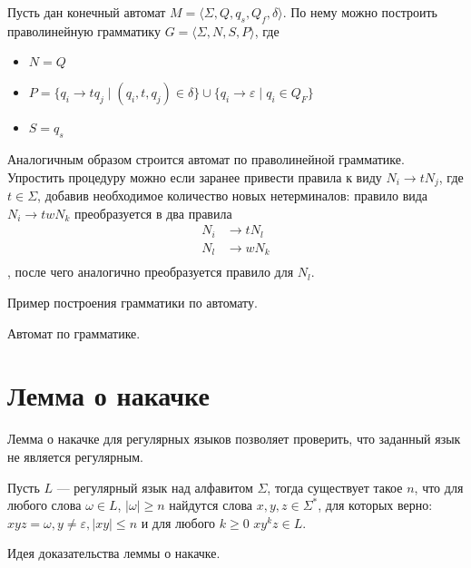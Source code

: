 Пусть дан конечный автомат $M = \langle \Sigma, Q, q_s, Q_f, \delta \rangle$. По нему можно построить праволинейную грамматику $G=\langle \Sigma, N, S, P \rangle$, где
\begin{itemize}
    \item $N = Q$
    \item $P = \{ q_i \to t q_j \mid (q_i, t, q_j)\in \delta\} \cup \{ q_i \to \varepsilon \mid q_i \in Q_F\}$
    \item $S = q_s$
\end{itemize}

Аналогичным образом строится автомат по праволинейной грамматике.
Упростить процедуру можно если заранее привести правила к виду $N_i \to tN_j$, где $t\in \Sigma$, добавив необходимое количество новых нетерминалов:
правило вида $N_i \to twN_k$ преобразуется в два правила 
\begin{align*}
    N_i& \to tN_l\\
    N_l& \to wN_k \\
\end{align*}
, после чего аналогично преобразуется правило для $N_l$.

Пример построения грамматики по автомату.

Автомат по грамматике. 

\section{Лемма о накачке}

Лемма о накачке для регулярных языков позволяет проверить, что заданный язык не является регулярным.

\begin{lemma}
    Пусть $L$ --- регулярный язык над алфавитом $\Sigma$, тогда существует такое $n$, что для любого слова $\omega \in L$, $|\omega| \geq n$ найдутся слова $x,y,z\in \Sigma^*$, для которых верно: $xyz = \omega, y\neq \varepsilon,|xy|\leq n$ и для любого $k \geq 0$  $xy^kz \in L$.
\end{lemma}

Идея доказательства леммы о накачке.

